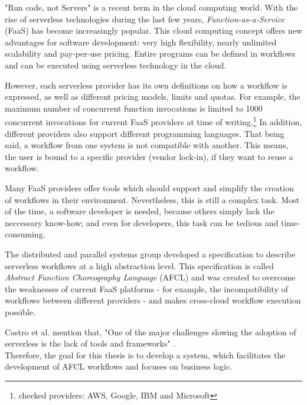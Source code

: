 \documentclass[a4paper,top=25mm,bottom=25mm,12pt,pdftex,halfparskip,twoside,bibtotoc,numbers=noenddot]{scrbook}
\begin{document}
"Run code, not Servers" is a recent term in the cloud computing world.
With the rise of serverless technologies during the last few years, \emph{Function-as-a-Service} (FaaS) has become increasingly popular. This cloud computing concept offers new advantages for software development: very high flexibility, nearly unlimited scalability and pay-per-use pricing. Entire programs can be defined in workflows and can be executed using serverless technology in the cloud.

However, each serverless provider has its own definitions on how a workflow is expressed, as well as different pricing models, limits and quotas. For example, the maximum number of concurrent function invocations is limited to 1000 concurrent invocations for current FaaS providers at time of writing.\footnote{checked providers: AWS, Google, IBM and Microsoft}
In addition, different providers also support different programming languages. That being said, a workflow from one system is not compatible with another. This means, the user is bound to a specific provider (vendor lock-in), if they want to reuse a workflow.

Many FaaS providers offer tools which should support and simplify the creation of workflows in their environment. Nevertheless, this is still a complex task. Most of the time, a software developer is needed, because others simply lack the neccessary know-how; and even for developers, this task can be tedious and time-consuming.

The distributed and parallel systems group developed a specification to describe serverless workflows at a high abstraction level. This specification is called \emph{Abstract Function Choreography Language} (AFCL) and was created to overcome the weaknesses of current FaaS platforms - for example, the incompatibility of workflows between different providers - and makes cross-cloud workflow execution possible.

Castro et al. mention that, "One of the major challenges slowing the adoption of serverless is the lack of tools and frameworks" \cite{articles-rise-of-serverless-castro}.\\
Therefore, the goal for this thesis is to develop a system, which facilitates the development of AFCL workflows and focuses on business logic.
\end{document}
